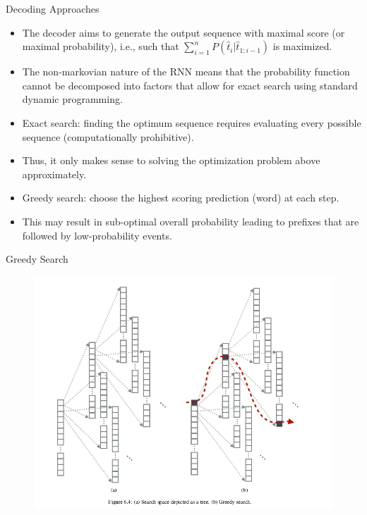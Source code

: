 \begin{frame}{Decoding Approaches}
\begin{scriptsize}
\begin{itemize}
\item The decoder aims to generate  the output sequence with maximal score (or maximal probability), i.e., such that $\sum_{i=1}^{n}P(\hat{t}_i | \hat{t}_{1:i-1})$ is maximized. 
\item The non-markovian nature of the RNN means that the probability function cannot be decomposed into factors that allow for exact search using standard dynamic programming.
\item Exact search: finding the optimum sequence requires evaluating every possible sequence (computationally prohibitive).
\item Thus, it only makes sense to solving the optimization problem above approximately.
\item Greedy search: choose the highest scoring prediction (word) at each step.
\item This may result in sub-optimal overall probability leading to
prefixes that are followed by low-probability events.

\end{itemize}
        
        
\end{scriptsize}
\end{frame}


\begin{frame}{Greedy Search}
        
         \begin{figure}[h]
        	\includegraphics[scale = 0.3]{pics/greedysearch.png}
        \end{figure}        
        
        
        
        
\end{frame}



